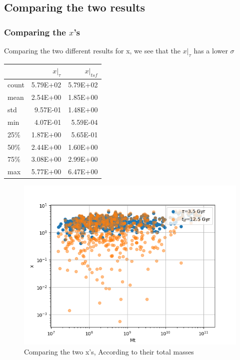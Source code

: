 \documentclass[a4paper,twocolumn]{article}
\begin{document}
\pagebreak
\subsection{Comparing the two results}
\label{sec:org531854c}

\subsubsection{Comparing the \(x\)'s}
\label{sec:org8a255b5}


Comparing the two different results for x, we see that the \(x|_\tau\) has a lower \(\sigma\)


\begin{table}[hc]
\centering
\begin{tabular}{lrr}
\toprule
{} &    $x|_\tau$ & $x|_{tsf}$ \\
\midrule
count & 5.79E+02 & 5.79E+02 \\
mean  & 2.54E+00 & 1.85E+00 \\
std   & 9.57E-01 & 1.48E+00 \\
min   & 4.07E-01 & 5.59E-04 \\
25\%   & 1.87E+00 & 5.65E-01 \\
50\%   & 2.44E+00 & 1.60E+00 \\
75\%   & 3.08E+00 & 2.99E+00 \\
max   & 5.77E+00 & 6.47E+00 \\
\bottomrule
\end{tabular}
\end{table}

\begin{figure}[!htpb]
\centering
\includegraphics[width=.9\linewidth]{./figs/Comparing_the_x_Mt.png}
\caption{\label{fig:Comparing the two x's, According to their total masses}Comparing the two x's, According to their total masses}
\end{figure}
\end{document}
